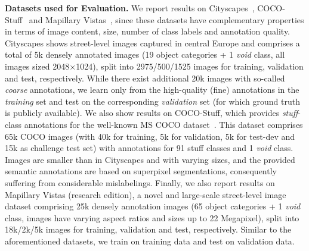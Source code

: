 \documentclass[10pt,twocolumn,letterpaper]{article}
\newcommand{\myparagraph}[1]{\vspace{5pt}\noindent\textbf{#1}}
\begin{document}
\myparagraph{Datasets used for Evaluation.}
We report results on Cityscapes~\cite{Cordts2016}, COCO-Stuff~\cite{Caesar2016} and Mapillary Vistas~\cite{Neuhold2017}, since these datasets have complementary properties in terms of image content, size, number of class labels and annotation quality. Cityscapes shows street-level images captured in central Europe and comprises a total of 5k densely annotated images (19 object categories + 1 \textit{void} class, all images sized 2048$\times$1024), split into 2975/500/1525 images for training, validation and test, respectively. While there exist additional 20k images with so-called \textit{coarse} annotations, we learn only from the high-quality (fine) annotations in the \textit{training} set and test on the corresponding \textit{validation} set (for which ground truth is publicly available).
We also show results on COCO-Stuff, which provides \textit{stuff}-class annotations for the well-known MS COCO dataset~\cite{LinMSCOCO2014}. This dataset comprises 65k COCO images (with 40k for training, 5k for validation, 5k for test-dev and 15k as challenge test set) with annotations for 91 stuff classes and 1 \textit{void} class. Images are smaller than in Cityscapes and with varying sizes, and the provided semantic annotations are based on superpixel segmentations, consequently suffering from considerable mislabelings. 
Finally, we also report results on Mapillary Vistas (research edition), a novel and large-scale street-level image dataset comprising 25k densely annotation images (65 object categories + 1 \textit{void} class, images have varying aspect ratios and sizes up to 22 Megapixel), split into 18k/2k/5k images for training, validation and test, respectively. Similar to the aforementioned datasets, we train on training data and test on validation data.
\end{document}
